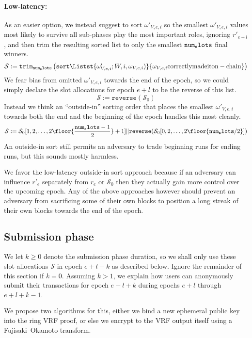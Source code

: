 \paragraph{Low-latency:} 
As an easier option, we instead suggest to sort $\omega'_{V,e,i}$ so the smallest $\omega'_{V,e,i}$ values most likely to survive all sub-phases play the most important roles, ignoring $r'_{e+l}$, and then trim the resulting sorted list to only the smallest $\mathtt{num_slots}$ final winners. 
$$ 
\mathcal{S} := \mathtt{trim}_\vrfaslotsbound \left( 
\mathtt{sort} \Listst{
  \omega'_{V,e,i}; W,i,\omega_{V,e,i}) 
}{
  \omega_{V,e,i} \mathrm{ correctly made it on-chain}
} \right) 
$$
We fear bias from omitted $\omega'_{V,e,i}$ towards the end of the epoch, so we could simply declare the slot allocations for epoch $e+l$ to be the reverse of this list.
$$ \mathcal{S} := \mathtt{reverse}( \mathcal{S}_0 )$$
Instead we think an ``outside-in'' sorting order that places the smallest $\omega'_{V,e,i}$ towards both the end and the beginning of the epoch handles this most cleanly.
$$ 
\mathcal{S} := 
  \mathcal{S}_0[ 1,2,\ldots, 2 \floor{{\vrfaslotsbound-1 \over 2}} + 1 ]
\|
  \mathtt{reverse}( \mathcal{S}_0[ 0,2,\ldots, 2 \floor{\vrfaslotsbound/2}] )
$$
An outside-in sort still permits an adversary to trade beginning runs for ending runs, but this sounds mostly harmless.

We favor the low-latency outside-in sort approach because if an adversary can influence $r'_e$ separately from $r_e$ or $\mathcal{S}_0$ then they actually gain more control over the upcoming epoch.  Any of the above approaches however should prevent an adversary from sacrificing some of their own blocks to position a long streak of their own blocks towards the end of the epoch.  


\subsection{Submission phase}\label{subsec:submission_phase}

We let $k \ge 0$ denote the submission phase duration, so we shall only use these slot allocations $\mathcal{S}$ in epoch $e+l+k$ as described below.  Ignore the remainder of this section if $k=0$.  Assuming $k>1$, we explain how users can anonymously submit their transactions for epoch $e+l+k$ during epochs $e+l$ through $e+l+k-1$.

We propose two algorithms for this, either we bind a new ephemeral public key into the ring VRF proof, or else we encrypt to the VRF output itself using a Fujisaki–Okamoto transform. 

